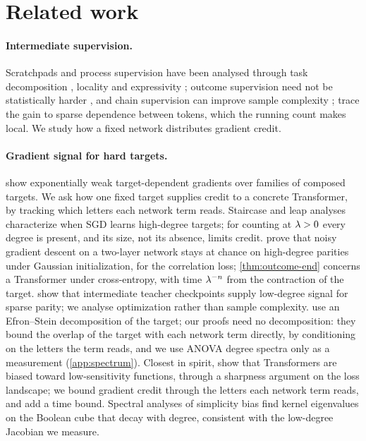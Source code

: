 \section{Related work}
\label{sec:related}

\paragraph{Intermediate supervision.} Scratchpads and process supervision
\citep{nye2021scratchpads,uesato2022solving,wei2022cot,lightman2023verify} have been analysed through task decomposition
\citep{wies2023subtask}, locality \citep{prystawski2023think,abbe2024globality} and expressivity
\citep{feng2023towards,merrill2024expressive,malach2023autoregressive}; outcome supervision need not be statistically
harder \citep{jia2025verify}, and chain supervision can improve sample complexity
\citep{hanneke2026samplecomplexityautoregressivereasoning,wen2024sparse}; \citet{wen2024sparse} trace the gain to sparse
dependence between tokens, which the running count makes local. We study how a fixed network distributes gradient credit.

\paragraph{Gradient signal for hard targets.} \citet{shalevshwartz2017failures} show exponentially weak target-dependent
gradients over families of composed targets. We ask how one fixed target supplies credit to a concrete Transformer, by tracking
which letters each network term reads. Staircase and leap analyses \citep{abbe2021staircase,abbe2022mergedstaircase,abbe2023sgd} characterize when SGD
learns high-degree targets; for counting at $\lambda>0$ every degree is present, and its size, not its absence, limits
credit. \citet{abbe2025parities} prove that noisy gradient descent on a two-layer network stays at chance on high-degree
parities under Gaussian initialization, for the correlation loss; \cref{thm:outcome-end} concerns a Transformer under
cross-entropy, with time $\lambda^{-n}$ from the contraction of the target. \citet{panigrahi2025progressive} show that
intermediate teacher checkpoints supply low-degree signal for sparse parity; we analyse optimization rather than sample
complexity. \citet{li2025noise} use an Efron--Stein decomposition of the target; our proofs need no decomposition: they bound the
overlap of the target with each network term directly, by conditioning on the letters the term reads, and we use ANOVA degree spectra
only as a measurement (\cref{app:spectrum}). Closest in spirit,
\citet{hahn2024sensitive} show that Transformers are biased toward low-sensitivity functions, through a sharpness argument on
the loss landscape; we bound gradient credit through the letters each network term reads, and add a time bound. Spectral analyses of simplicity bias \citep{yang2019spectral} find kernel eigenvalues on the Boolean cube that
decay with degree, consistent with the low-degree Jacobian we measure.

